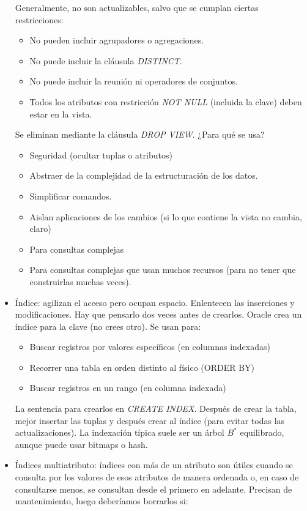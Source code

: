 \begin{itemize}
Generalmente, no son actualizables, salvo que se cumplan ciertas restricciones:
\begin{itemize}
\item No pueden incluir agrupadores o agregaciones.
\item No puede incluir la cláusula \textit{DISTINCT}.
\item No puede incluir la reunión ni operadores de conjuntos.
\item Todos los atributos con restricción \textit{NOT NULL} (incluida la clave) deben estar en la vista.
\end{itemize}
Se eliminan mediante la cláusula \textit{DROP VIEW}. ¿Para qué  se usa?
\begin{itemize}
\item Seguridad (ocultar tuplas o atributos)
\item Abstraer de la complejidad de la estructuración de los datos.
\item Simplificar comandos.
\item Aislan aplicaciones de los cambios (si lo que contiene la vista no cambia, claro)
\item Para consultas complejas
\item Para consultas complejas que usan muchos recursos (para no tener que construirlas muchas veces).
\end{itemize}
\item Índice: agilizan el acceso pero ocupan espacio. Enlentecen las inserciones y modificaciones. Hay que pensarlo dos veces antes de crearlos. Oracle crea un índice para la clave (no crees otro). Se usan para:
\begin{itemize}
\item Buscar registros por valores específicos (en columnas indexadas)
\item Recorrer una tabla en orden distinto al físico (ORDER BY)
\item Buscar registros en un rango (en columna indexada)
\end{itemize}
La sentencia para crearlos en \textit{CREATE INDEX}. Después de crear la tabla, mejor insertar las tuplas y después crear al índice (para evitar todas las actualizaciones). La indexación típica suele ser un árbol $B^*$ equilibrado, aunque puede usar bitmaps o hash.
\item Índices multiatributo: índices con más de un atributo son útiles cuando se consulta por los valores de esos atributos de manera ordenada o, en caso de consultarse menos, se consultan desde el primero en adelante. Precisan de mantenimiento, luego deberíamos borrarlos si:

\end{itemize}
